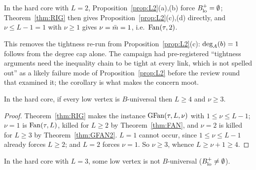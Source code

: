 \begin{corollary}\label{cor:RIG1}
In the hard core with $L = 2$, Proposition~\ref{prop:L2}(a),(b) force
$B_{\mathrm{lo}}^{+} = \emptyset$; Theorem~\ref{thm:RIG} then gives Proposition~\ref{prop:L2}(c),(d)
directly, and $\nu \le L-1 = 1$ with $\nu \ge 1$ gives $\nu = \bar{m} = 1$, i.e.\
$\mathrm{Fan}(\tau,2)$.
\end{corollary}

This removes the tightness re-run from Proposition~\ref{prop:L2}(c): $\mathrm{deg}_A(b) = 1$ follows
from the degree cap alone. The campaign had pre-registered ``tightness arguments need the
inequality chain to be tight at every link, which is not spelled out'' as a likely failure
mode of Proposition~\ref{prop:L2} before the review round that examined it; the corollary is
what makes the concern moot.

\begin{corollary}\label{cor:GFAN2HC}
In the hard core, if every low vertex is $B$-universal then $L \ge 4$ and $\nu \ge 3$.
\end{corollary}

\begin{proof}
Theorem~\ref{thm:RIG} makes the instance $\mathrm{GFan}(\tau,L,\nu)$ with $1 \le \nu \le L-1$;
$\nu = 1$ is $\mathrm{Fan}(\tau,L)$, killed for $L \ge 2$ by Theorem~\ref{thm:FAN}, and $\nu = 2$ is
killed for $L \ge 3$ by Theorem~\ref{thm:GFAN2}. $L = 1$ cannot occur, since
$1 \le \nu \le L-1$ already forces $L \ge 2$; and $L = 2$ forces $\nu = 1$. So $\nu \ge 3$,
whence $L \ge \nu+1 \ge 4$.
\end{proof}

\begin{corollary}\label{cor:GFAN2L3}
In the hard core with $L = 3$, some low vertex is not $B$-universal
($B_{\mathrm{lo}}^{+} \ne \emptyset$).
\end{corollary}

